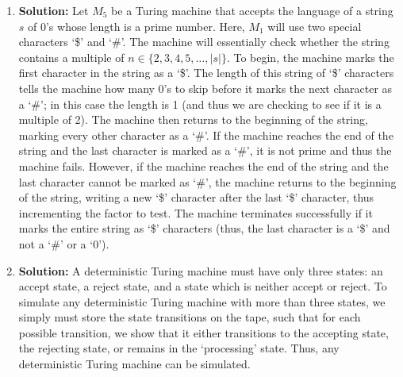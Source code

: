 \documentclass{article}
\begin{document}
\begin{enumerate}
    \item \textbf{Solution:}
    Let $M_{5}$ be a Turing machine that accepts the language of a string $s$ of 0's whose length is a prime number. Here, $M_{1}$ will use two special characters `\$' and `\#'. The machine will essentially check whether the string contains a multiple of $n \in \{2,3,4,5,\dots,|s|\}$. To begin, the machine marks the first character in the string as a `\$'. The length of this string of `\$' characters tells the machine how many 0's to skip before it marks the next character as a `\#'; in this case the length is 1 (and thus we are checking to see if it is a multiple of 2). The machine then returns to the beginning of the string, marking every other character as a `\#'. If the machine reaches the end of the string and the last character is marked as a `\#', it is not prime and thus the machine fails. However, if the machine reaches the end of the string and the last character cannot be marked as `\#', the machine returns to the beginning of the string, writing a new `\$' character after the last `\$' character, thus incrementing the factor to test. The machine terminates successfully if it marks the entire string as `\$' characters (thus, the last character is a `\$' and not a `\#' or a `0').

    \item \textbf{Solution:}
    A deterministic Turing machine must have only three states: an accept state, a reject state, and a state which is neither accept or reject. To simulate any deterministic Turing machine with more than three states, we simply must store the state transitions on the tape, such that for each possible transition, we show that it either transitions to the accepting state, the rejecting state, or remains in the `processing' state. Thus, any deterministic Turing machine can be simulated.
    \end{enumerate}
\end{document}
